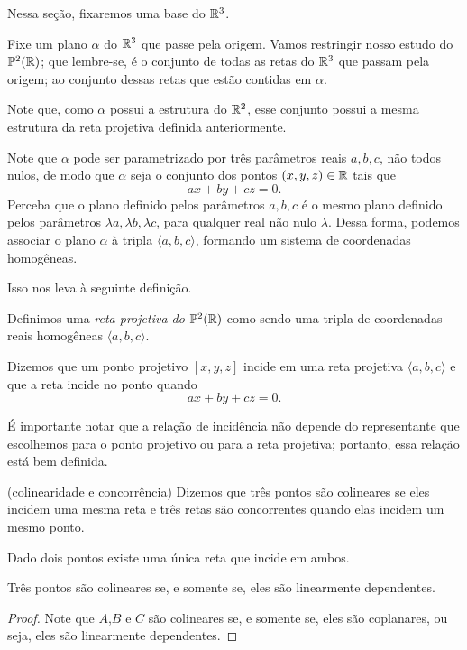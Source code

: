 Nessa seção, fixaremos uma base do \(\mathbb{R}^3\).

Fixe um plano $\alpha$ do \(\mathbb{R}^3\) que passe pela origem. 
Vamos restringir nosso estudo do \(\mathbb{P}^2(\mathbb{R})\); que lembre-se, é o conjunto de todas as retas do \(\mathbb{R}^3\) que passam pela origem; ao conjunto dessas retas que estão contidas em $\alpha$. 


Note que, como $\alpha$ possui a estrutura do $\mathbb{R}^2$, esse conjunto possui a mesma estrutura da reta projetiva definida anteriormente.

Note que $\alpha$ pode ser parametrizado por três parâmetros reais $a, b, c$, não todos nulos, de modo que $\alpha$ seja o conjunto dos pontos $(x, y, z) \in \mathbb{R}$ tais que \[
    ax + by + cz = 0.
\]
Perceba que o plano definido pelos parâmetros $a, b, c$ é o mesmo plano definido pelos parâmetros $\lambda a, \lambda b, \lambda c$, para qualquer real não nulo $\lambda$. Dessa forma, podemos associar o plano $\alpha$ à tripla $\langle a, b, c \rangle$, formando um sistema de coordenadas homogêneas.

Isso nos leva à seguinte definição.

\begin{defn}
Definimos uma \emph{reta projetiva do \(\mathbb{P}^2(\mathbb{R})\)} como sendo uma tripla de coordenadas reais homogêneas $\langle a, b, c \rangle$.

Dizemos que um ponto projetivo $[x, y, z]$ incide em uma reta projetiva $\langle a, b, c\rangle$ e que a reta incide no ponto quando \[
ax + by + cz = 0.
\]
\end{defn}

É importante notar que a relação de incidência não depende do representante que escolhemos para o ponto projetivo ou para a reta projetiva; portanto, essa relação está bem definida.

\begin{defn}(colinearidade e concorrência)
Dizemos que três pontos são colineares se eles incidem uma mesma reta e três retas são concorrentes quando elas incidem um mesmo ponto.
\end{defn}
\begin{prop}
Dado dois pontos existe uma única reta que incide em ambos.
\end{prop}




\begin{lem}
Três pontos são colineares se, e somente se, eles são linearmente dependentes.
\end{lem}
\begin{proof}
Note que $A$,$B$ e $C$ são colineares se, e somente se, eles são coplanares, ou seja, eles são linearmente dependentes.
\end{proof}

